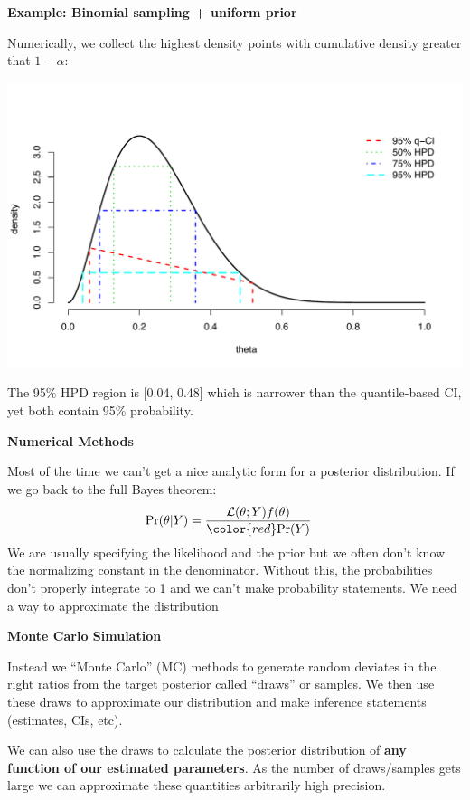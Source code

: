 \documentclass[12pt,xcolor=svgnames]{beamer}
\newcommand{\rd}{\color{red}}
\newcommand{\bl}{\color{blue}}
\newcommand{\theme}{\color{FireBrick}}
\newcommand{\sk}{\vspace{.4cm}}
\newcommand{\chap}[1]{{\theme \Large \bf #1} \sk}
\begin{document}
\begin{frame}
\chap{Example: Binomial sampling + uniform prior}

Numerically, we collect the highest density points with cumulative density greater that $1-\alpha$: 
\begin{center}
\includegraphics[scale=0.275,trim=30 30 0 20]{HPD_example}
\end{center}
The 95\% HPD region is [0.04, 0.48] which is narrower than the quantile-based CI, yet both contain 95\% probability.
\end{frame}


\begin{frame}
\chap{Numerical Methods}

Most of the time we can't get a nice analytic form for a posterior distribution. If we go back to the full Bayes theorem:
\begin{align*}
\text{Pr}(\theta|Y) & = \frac{\mathcal{L}(\theta; Y)f(\theta)}{{\rd \text{Pr}(Y)}}
\end{align*}
We are usually specifying the likelihood and the prior but we often don't know the normalizing constant in the denominator. Without this, the probabilities don't properly integrate to 1 and we {\rd can't make probability statements}. We need a way to approximate the distribution \\
\end{frame}

\begin{frame}
\chap{Monte Carlo Simulation}

Instead we ``Monte Carlo'' (MC) methods to generate random deviates in the right ratios from the target posterior called ``{\bl draws}'' or samples. We then use these draws to approximate our distribution and make inference statements (estimates, CIs, etc). 

\sk
We can also use the draws to calculate the posterior distribution of {\bf \bl any function of our estimated parameters}. As the number of draws/samples gets large we can approximate these quantities arbitrarily high precision.


\end{frame}
\end{document}
